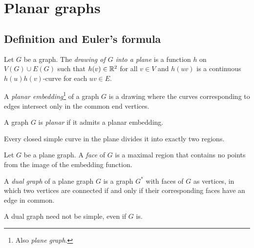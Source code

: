 \section{Planar graphs}

\subsection{Definition and Euler's formula}


\begin{definicija}
Let $G$ be a graph. The
\emph{drawing of $G$ into a plane} is a
function $h$ on $V(G) \cup E(G)$ such that $h(v) \in \mathbb{R}^2$ for all
$v \in V$ and $h(uv)$ is a continuous $h(u) h(v)$-curve for each
$uv \in E$.
\end{definicija}

\begin{definicija}
A
\emph{planar embedding}\footnote{Also \emph{plane graph}.}
of a graph $G$ is a drawing where the curves corresponding to edges
intersect only in the common end vertices.
\end{definicija}

\begin{definicija}
A graph $G$ is \emph{planar} if it admits a
planar embedding.
\end{definicija}

\begin{izrek}[Jordan]
Every closed simple curve in the plane divides it into exactly two
regions.
\end{izrek}

\begin{definicija}
Let $G$ be a plane graph. A \emph{face} of $G$ is a
maximal region that contains no points from the image of the
embedding function.
\end{definicija}

\begin{definicija}
A \emph{dual graph} of a plane graph $G$ is a
graph $G^*$ with faces of $G$ as vertices, in which two vertices
are connected if and only if their corresponding faces have an edge
in common.
\end{definicija}

\begin{opomba}
A dual graph need not be simple, even if $G$ is.
\end{opomba}

